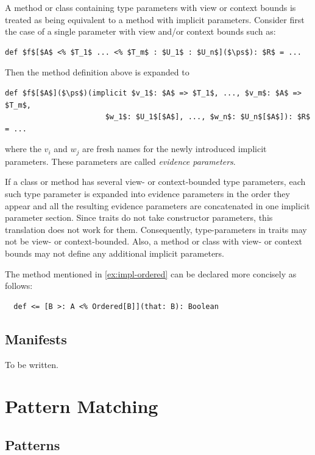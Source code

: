 A method or class containing type parameters with view or context bounds is treated as being
equivalent to a method with implicit parameters. Consider first the case of a
single parameter with view and/or context bounds such as:
\begin{lstlisting}
def $f$[$A$ <% $T_1$ ... <% $T_m$ : $U_1$ : $U_n$]($\ps$): $R$ = ...
\end{lstlisting}
Then the method definition above is expanded to
\begin{lstlisting}
def $f$[$A$]($\ps$)(implicit $v_1$: $A$ => $T_1$, ..., $v_m$: $A$ => $T_m$,
                       $w_1$: $U_1$[$A$], ..., $w_n$: $U_n$[$A$]): $R$ = ...
\end{lstlisting}
where the $v_i$ and $w_j$ are fresh names for the newly introduced implicit parameters. These
parameters are called {\em evidence parameters}.

If a class or method has several view- or context-bounded type parameters, each
such type parameter is expanded into evidence parameters in the order
they appear and all the resulting evidence parameters are concatenated
in one implicit parameter section.  Since traits do not take
constructor parameters, this translation does not work for them.
Consequently, type-parameters in traits may not be view- or context-bounded.
Also, a method or class with view- or context bounds may not define any
additional implicit parameters.

\example The \code{<=} method mentioned in \ref{ex:impl-ordered} can be declared
more concisely as follows:
\begin{lstlisting}
  def <= [B >: A <% Ordered[B]](that: B): Boolean
\end{lstlisting}

\section{Manifests}\label{sec:manifests}

To be written.

\chapter{Pattern Matching}

\section{Patterns}

\label{sec:patterns}

